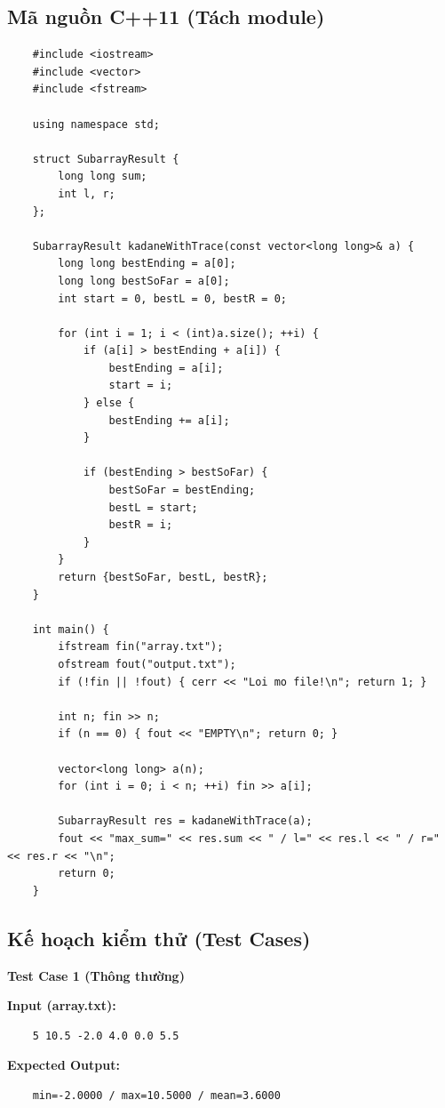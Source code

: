 \subsection{Mã nguồn C++11 (Tách module)}
    \begin{lstlisting}
    #include <iostream>
    #include <vector>
    #include <fstream>

    using namespace std;

    struct SubarrayResult {
        long long sum;
        int l, r;
    };

    SubarrayResult kadaneWithTrace(const vector<long long>& a) {
        long long bestEnding = a[0];
        long long bestSoFar = a[0];
        int start = 0, bestL = 0, bestR = 0;

        for (int i = 1; i < (int)a.size(); ++i) {
            if (a[i] > bestEnding + a[i]) {
                bestEnding = a[i];
                start = i;
            } else {
                bestEnding += a[i];
            }

            if (bestEnding > bestSoFar) {
                bestSoFar = bestEnding;
                bestL = start;
                bestR = i;
            }
        }
        return {bestSoFar, bestL, bestR};
    }

    int main() {
        ifstream fin("array.txt");
        ofstream fout("output.txt");
        if (!fin || !fout) { cerr << "Loi mo file!\n"; return 1; }

        int n; fin >> n;
        if (n == 0) { fout << "EMPTY\n"; return 0; }
        
        vector<long long> a(n);
        for (int i = 0; i < n; ++i) fin >> a[i];

        SubarrayResult res = kadaneWithTrace(a);
        fout << "max_sum=" << res.sum << " / l=" << res.l << " / r=" << res.r << "\n";
        return 0;
    }
\end{lstlisting}

\subsection{Kế hoạch kiểm thử (Test Cases)}

    \textbf{Test Case 1 (Thông thường)}

    \textbf{Input (array.txt):}
    \begin{lstlisting}
    5 10.5 -2.0 4.0 0.0 5.5\end{lstlisting}

    \textbf{Expected Output:}
    \begin{lstlisting}
    min=-2.0000 / max=10.5000 / mean=3.6000\end{lstlisting}

